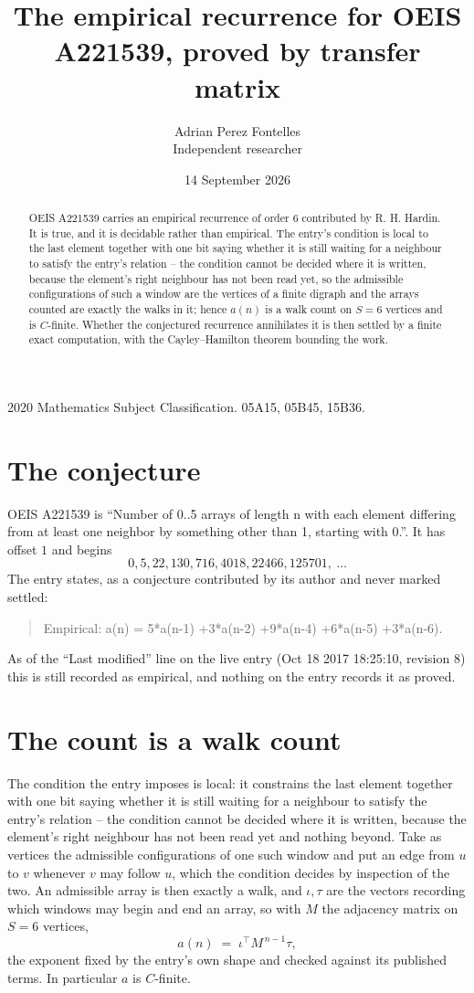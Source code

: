\documentclass[11pt,a4paper]{article}
\title{The empirical recurrence for OEIS A221539, proved by transfer matrix}
\author{Adrian Perez Fontelles\\ \small Independent researcher}
\date{14 September 2026}
\theoremstyle{plain}
\theoremstyle{definition}
\begin{document}
\maketitle

\begin{abstract}
OEIS A221539 carries an empirical recurrence of order $6$ contributed by R. H. Hardin. It is
true, and it is decidable rather than empirical. The entry's condition is local to the last element together with one bit saying whether it is still waiting for a neighbour to satisfy the entry's relation -- the condition cannot be decided where it is written, because the element's right neighbour has not been read yet, so
the admissible configurations of such a window are the vertices of a finite digraph and the
arrays counted are exactly the walks in it; hence $a(n)$ is a walk count on $S=6$ vertices
and is $C$-finite. Whether the conjectured recurrence annihilates it is then settled by a
finite exact computation, with the Cayley--Hamilton theorem bounding the work.
\end{abstract}

\noindent\small 2020 Mathematics Subject Classification. 05A15, 05B45, 15B36.\normalsize

\section{The conjecture}

OEIS A221539 is ``Number of 0..5 arrays of length n with each element differing from at least one neighbor by something other than 1, starting with 0.''. It has offset $1$ and begins
\[
0, 5, 22, 130, 716, 4018, 22466, 125701,\ \dots
\]
The entry states, as a conjecture contributed by its author and never marked settled:
\begin{quote}
Empirical: a(n) = 5*a(n-1) +3*a(n-2) +9*a(n-4) +6*a(n-5) +3*a(n-6).
\end{quote}
As of the ``Last modified'' line on the live entry (Oct 18 2017 18:25:10, revision 8) this is still
recorded as empirical, and nothing on the entry records it as proved.

\section{The count is a walk count}

The condition the entry imposes is local: it constrains the last element together with one bit saying whether it is still waiting for a neighbour to satisfy the entry's relation -- the condition cannot be decided where it is written, because the element's right neighbour has not been read yet and nothing beyond. Take as vertices the admissible configurations of one such window and put an edge from $u$ to $v$ whenever $v$ may follow $u$, which the condition decides by inspection of the two.
An admissible array is then exactly a walk, and $\iota,\tau$ are the vectors recording which windows may begin and end an array, so with $M$ the adjacency matrix on $S=6$ vertices,
\[
a(n)\;=\;\iota^{\!\top}M^{\,n-1}\tau ,
\]
the exponent fixed by the entry's own shape and checked against its published terms. In
particular $a$ is $C$-finite.
\end{document}
